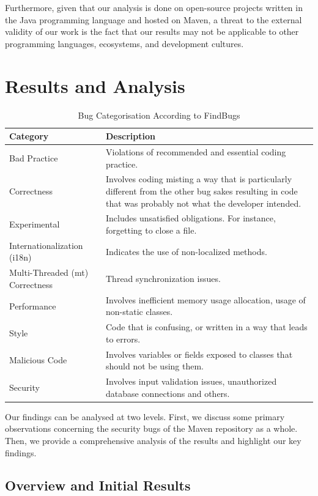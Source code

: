 \documentclass[conference]{llncs}
\begin{document}
Furthermore, given that our analysis is done on open-source projects
written in the Java programming language and hosted on Maven,
a threat to the external validity of our work
is the fact that our results may not be applicable to other
programming languages, ecosystems, and development cultures.

\section{Results and Analysis}
\label{sec:res}

\begin{table}[t]
\centering
\caption{Bug Categorisation According to FindBugs}
\label{tbl:bug-cat}
\begin{tabular}{l p{23em}}
\hline
Category & Description\\
\hline
Bad Practice & Violations of recommended and essential
coding practice. \\
Correctness & Involves coding misting a way that is particularly different from the other bug sakes resulting in code
that was probably not what the developer intended. \\
Experimental & Includes unsatisfied obligations. For instance,
forgetting to close a file. \\
Internationalization (i18n) & Indicates the use of non-localized methods. \\
Multi-Threaded ({\sc mt}) Correctness & Thread synchronization issues. \\
Performance & Involves inefficient memory usage allocation, usage 
of non-static classes. \\
Style & Code that is confusing, or
written in a way that leads to errors.\\
Malicious Code & Involves variables or fields exposed to classes that should
not be using them. \\
Security & Involves input validation issues, unauthorized database connections
and others. \\
\hline
\end{tabular}
\end{table}

Our findings can be analysed at two levels. First, we discuss some
primary observations concerning the security bugs of the Maven repository as a whole.
Then, we provide a comprehensive analysis of the results and highlight our key findings.

\subsection{Overview and Initial Results}
\label{sec:overview}
\end{document}
